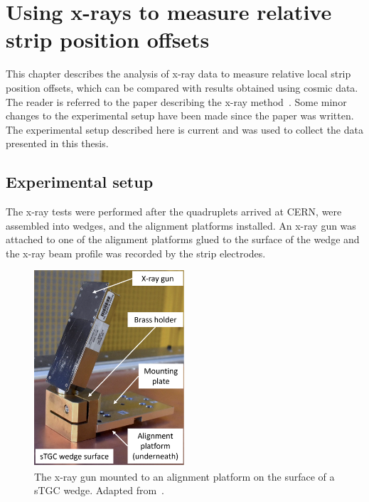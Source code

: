 
\chapter{Using x-rays to measure relative strip position offsets}
\label{chap:xray}

This chapter describes the analysis of x-ray data to measure relative local strip position offsets, which can be compared with results obtained using cosmic data. The reader is referred to the paper describing the x-ray method~\cite{lefebvre_precision_2020}. Some minor changes to the experimental setup have been made since the paper was written. The experimental setup described here is current and was used to collect the data presented in this thesis.

\section{Experimental setup}

The x-ray tests were performed after the quadruplets arrived at CERN, were assembled into wedges, and the alignment platforms installed. An x-ray gun was attached to one of the alignment platforms glued to the surface of the wedge and the x-ray beam profile was recorded by the strip electrodes.

\begin{figure}[t]
    \centering
    \includegraphics[width = 0.5\textwidth]{figures/xray_setup.png}
    \caption{The x-ray gun mounted to an alignment platform on the surface of  a sTGC wedge. Adapted from~\cite{lefebvre_precision_2020}.}
    \label{fig:xray_setup}
\end{figure}

